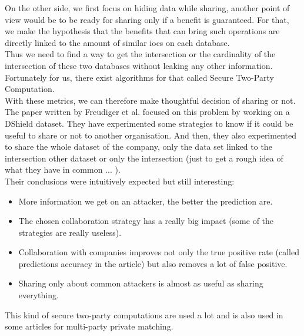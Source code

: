 \documentclass{eplmastersthesis}
\begin{document}
On the other side, we first focus on hiding data while sharing, another point of view would be to be ready for sharing only if a benefit is guaranteed. For that, we make the hypothesis that the benefits that can bring such operations are directly linked to the amount of similar \gls{ioc}s on each database.\\
Thus we need to find a way to get the intersection or the cardinality of the intersection of these two databases without leaking any other information. Fortunately for us, there exist algorithms for that called Secure Two-Party Computation.\\
With these metrics, we can therefore make thoughtful decision of sharing or not.\\
The paper written by Freudiger et al.\cite{freudiger2015controlled} focused on this problem by working on a DShield dataset. They have experimented some strategies to know if it could be useful to share or not to another organisation. And then, they also experimented to share the whole dataset of the company, only the data set linked to the intersection other dataset or only the intersection (just to get a rough idea of what they have in common ... ).\\
Their conclusions were intuitively expected but still interesting:
\begin{itemize}
\item More information we get on an attacker, the better the prediction are.
\item The chosen collaboration strategy has a really big impact (some of the strategies are really useless).
\item Collaboration with companies improves not only the true positive rate (called predictions accuracy in the article) but also removes a lot of false positive.
\item Sharing only about common attackers is almost as useful as sharing everything.
\end{itemize}

This kind of secure two-party computations are used a lot and is also used in some articles for multi-party private matching. 
\end{document}

